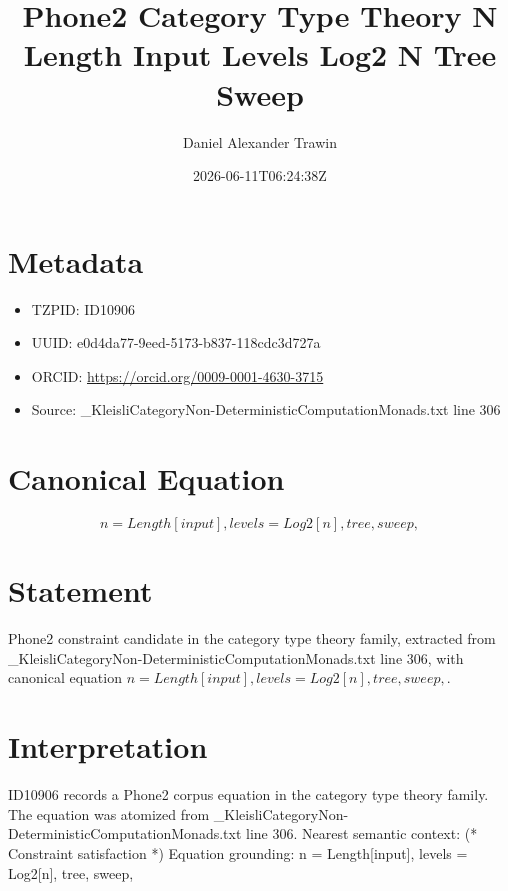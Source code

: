 \documentclass[11pt]{article}
\title{Phone2 Category Type Theory N Length Input Levels Log2 N Tree Sweep}
\author{Daniel Alexander Trawin}
\date{2026-06-11T06:24:38Z}
\begin{document}
\maketitle
\section*{Metadata}
\begin{itemize}
\item TZPID: ID10906
\item UUID: e0d4da77-9eed-5173-b837-118cdc3d727a
\item ORCID: \url{https://orcid.org/0009-0001-4630-3715}
\item Source: _KleisliCategoryNon-DeterministicComputationMonads.txt line 306
\end{itemize}
\section*{Canonical Equation}
\[
{n = Length[input], levels = Log2[n], tree, sweep},
\]
\section*{Statement}
Phone2 constraint candidate in the category type theory family, extracted from _KleisliCategoryNon-DeterministicComputationMonads.txt line 306, with canonical equation ${n = Length[input], levels = Log2[n], tree, sweep},$.
\section*{Interpretation}
ID10906 records a Phone2 corpus equation in the category type theory family. The equation was atomized from _KleisliCategoryNon-DeterministicComputationMonads.txt line 306. Nearest semantic context: (* Constraint satisfaction *) Equation grounding: {n = Length[input], levels = Log2[n], tree, sweep},
\end{document}
